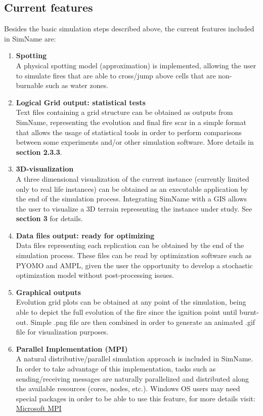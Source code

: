 \documentclass[11pt]{article}
\begin{document}
\subsection{Current features}
Besides the basic simulation steps described above, the current features included in SimName are:
\begin{enumerate}
	\item \textbf{Spotting}\\
		A physical spotting model (approximation) is implemented, allowing the user to simulate fires that are able to cross/jump above cells that are non-burnable such as water zones. 
		
	\item \textbf{Logical Grid output: statistical tests}\\
		Text files containing a grid structure can be obtained as outputs from SimName, representing the evolution and final fire scar in a simple format that allows the usage of statistical tools in order to perform comparisons between some experiments and/or other simulation software. More details in \textbf{section 2.3.3}.
	
	\item \textbf{3D-visualization}\\
		A three dimensional visualization of the current instance (currently limited only to real life instances) can be obtained as an executable application by the end of the simulation process. Integrating SimName with a GIS allows the user to visualize a 3D terrain representing the instance under study. See \textbf{section 3} for details.
		
	\item \textbf{Data files output: ready for optimizing}\\
		Data files representing each replication can be obtained by the end of the simulation process. These files can be read by optimization software such as PYOMO and AMPL, given the user the opportunity to develop a stochastic optimization model without post-processing issues. 
		
	\item \textbf{Graphical outputs}\\
		Evolution grid plots can be obtained at any point of the simulation, being able to depict the full evolution of the fire since the ignition point until burnt-out. Simple .png file are then combined in order to generate an animated .gif file for visualization purposes.

	\item \textbf{Parallel Implementation (MPI)}\\
		A natural distributive/parallel simulation approach is included in SimName. In order to take advantage of this implementation, tasks such as sending/receiving messages are naturally parallelized and distributed along the available resources (cores, nodes, etc.). Windows OS users may need special packages in order to be able to use this feature, for more details visit: \href {https://msdn.microsoft.com/en-us/library/bb524831%28v=vs.85%29.aspx?f=255&MSPPError=-2147217396}{Microsoft MPI} 
\end{enumerate}
\end{document}
